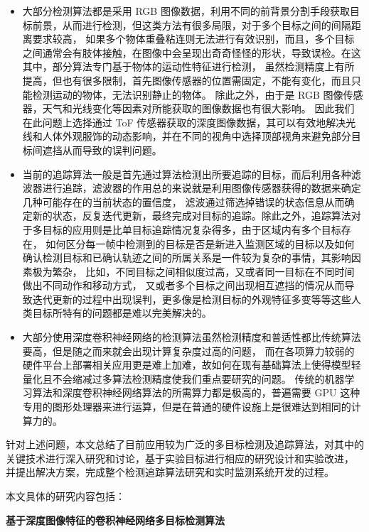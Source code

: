 \begin{itemize}
	\item 大部分检测算法都是采用 RGB 图像数据，利用不同的前背景分割手段获取目标前景，从而进行检测，但这类方法有很多局限，对于多个目标之间的间隔距离要求较高，
    如果多个物体重叠粘连则无法进行有效识别，而且，多个目标之间通常会有肢体接触，在图像中会呈现出奇奇怪怪的形状，导致误检。在这其中，部分算法专门基于物体的运动性特征进行检测，
    虽然检测精度上有所提高，但也有很多限制，首先图像传感器的位置需固定，不能有变化，而且只能检测运动的物体，无法识别静止的物体。
    除此之外，由于是 RGB 图像传感器，天气和光线变化等因素对所能获取的图像数据也有很大影响。
    因此我们在此问题上选择通过 ToF 传感器获取的深度图像数据，其可以有效地解决光线和人体外观服饰的动态影响，并在不同的视角中选择顶部视角来避免部分目标间遮挡从而导致的误判问题。

	\item 当前的追踪算法一般是首先通过算法检测出所要追踪的目标，而后利用各种滤波器进行追踪，滤波器的作用总的来说就是利用图像传感器获得的数据来确定几种可能存在的当前状态的置信度，
    滤波通过筛选掉错误的状态信息从而确定新的状态，反复迭代更新，最终完成对目标的追踪。除此之外，追踪算法对于多目标的应用则是比单目标追踪情况复杂得多，由于区域内有多个目标存在，
    如何区分每一帧中检测到的目标是否是新进入监测区域的目标以及如何确认检测目标和已确认轨迹之间的所属关系是一件较为复杂的事情，其影响因素极为繁杂，
    比如，不同目标之间相似度过高，又或者同一目标在不同时间做出不同动作和移动方式，
    又或者多个目标之间出现相互遮挡的情况从而导致迭代更新的过程中出现误判，更多像是检测目标的外观特征多变等等这些人类目标所特有的问题都是难以完美解决的。

	\item 大部分使用深度卷积神经网络的检测算法虽然检测精度和普适性都比传统算法要高，但是随之而来就会出现计算复杂度过高的问题，
    而在各项算力较弱的硬件平台上部署相关应用更是难上加难，故如何在现有基础算法上使得模型轻量化且不会缩减过多算法检测精度使我们重点要研究的问题。
    传统的机器学习算法和深度卷积神经网络算法的所需算力都是极高的，普遍需要 GPU 这种专用的图形处理器来进行运算，但是在普通的硬件设施上是很难达到相同的计算力的。
\end{itemize}
	
针对上述问题，本文总结了目前应用较为广泛的多目标检测及追踪算法，对其中的关键技术进行深入研究和讨论，基于实验目标进行相应的研究设计和实验改进，
并提出解决方案，完成整个检测追踪算法研究和实时监测系统开发的过程。

本文具体的研究内容包括：

\textbf{基于深度图像特征的卷积神经网络多目标检测算法}

